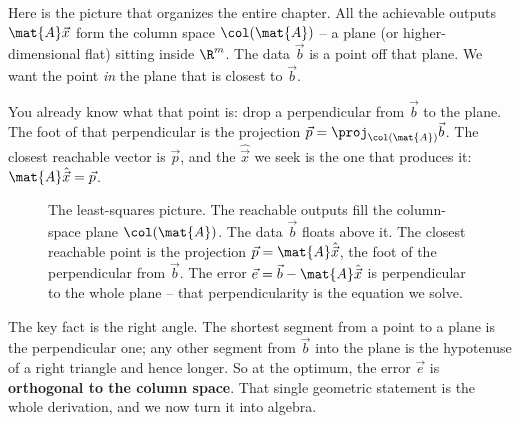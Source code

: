 Here is the picture that organizes the entire chapter. All the achievable outputs $\mat{A}\vec{x}$
form the column space $\col(\mat{A})$ -- a plane (or higher-dimensional flat) sitting inside
$\R^m$. The data $\vec{b}$ is a point off that plane. We want the point \emph{in} the plane that
is closest to $\vec{b}$.

You already know what that point is: drop a perpendicular from $\vec{b}$ to the plane. The foot of
that perpendicular is the projection $\vec{p}=\proj_{\col(\mat{A})}\vec{b}$. The closest reachable
vector is $\vec{p}$, and the $\hat{\vec{x}}$ we seek is the one that produces it:
$\mat{A}\hat{\vec{x}}=\vec{p}$.

\begin{figure}[H]
\centering
{}
\caption{The least-squares picture. The reachable outputs fill the column-space plane
$\col(\mat{A})$. The data $\vec{b}$ floats above it. The closest reachable point is the
projection $\vec{p}=\mat{A}\hat{\vec{x}}$, the foot of the perpendicular from $\vec{b}$. The error
$\vec{e}=\vec{b}-\mat{A}\hat{\vec{x}}$ is perpendicular to the whole plane -- that perpendicularity
is the equation we solve.}
\label{ch19:projection-picture}
\end{figure}

The key fact is the right angle. The shortest segment from a point to a plane is the
perpendicular one; any other segment from $\vec{b}$ into the plane is the hypotenuse of a right
triangle and hence longer. So at the optimum, the error $\vec{e}$ is \textbf{orthogonal to the
column space}. That single geometric statement is the whole derivation, and we now turn it into
algebra.

